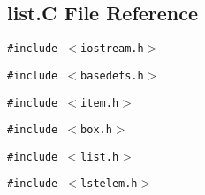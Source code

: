 \subsection{list.C File Reference}
\label{list.C}
{\tt \#include $<$iostream.h$>$}\par
{\tt \#include $<$basedefs.h$>$}\par
{\tt \#include $<$item.h$>$}\par
{\tt \#include $<$box.h$>$}\par
{\tt \#include $<$list.h$>$}\par
{\tt \#include $<$lstelem.h$>$}\par
